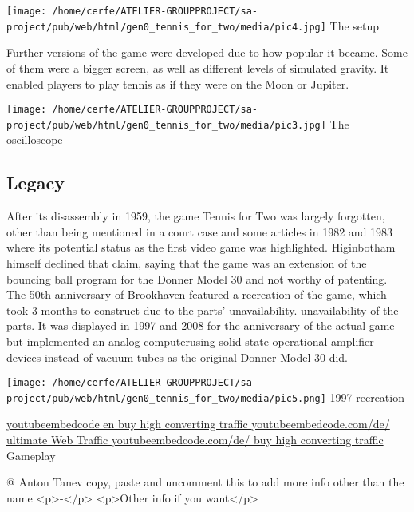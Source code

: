 \documentclass[a4paper,10pt]{book}
\begin{document}
 
 
 \texttt{[image: /home/cerfe/ATELIER-GROUPPROJECT/sa-project/pub/web/html/gen0\_tennis\_for\_two/media/pic4.jpg]}
 The setup 
 
 
 
        Further versions of the game were developed due to how popular it became. Some of them were a bigger screen,
        as well as different levels of simulated gravity. It enabled players to play tennis as if they were on the
        Moon or Jupiter.
         
 
 
 \texttt{[image: /home/cerfe/ATELIER-GROUPPROJECT/sa-project/pub/web/html/gen0\_tennis\_for\_two/media/pic3.jpg]}
 The oscilloscope 
 
 
 \subsection{Legacy }
 
        After its disassembly in 1959,  the game Tennis for Two was largely forgotten, other than being mentioned in a
        court case and some articles in 1982 and 1983 where its potential status as the first video game was highlighted.
        Higinbotham himself declined that claim, saying that the game was an extension of the bouncing ball program for
        the Donner Model 30 and not worthy of patenting. The 50th anniversary of Brookhaven featured a recreation of the
        game, which took 3 months to construct due to the parts' unavailability. unavailability of the parts.  It was displayed in 1997 and 2008
        for the anniversary of the actual game but implemented an analog computerusing solid-state operational amplifier
         devices instead of vacuum tubes as the original Donner Model 30 did.
         
 
 
 \texttt{[image: /home/cerfe/ATELIER-GROUPPROJECT/sa-project/pub/web/html/gen0\_tennis\_for\_two/media/pic5.png]}
 1997 recreation 
 
 \href{https://youtubeembedcode.com/en}{youtubeembedcode en }\href{http://www.chkrootkit.org/}{buy high converting traffic }\href{https://youtubeembedcode.com/de/}{youtubeembedcode.com/de/ }\href{https://www.jubler.org/}{ultimate Web Traffic }\href{https://youtubeembedcode.com/de/}{youtubeembedcode.com/de/ }\href{http://www.chkrootkit.org/}{buy high converting traffic }
 Gameplay 
 
 
 @ Anton Tanev 
  copy, paste and uncomment this to add more info other than the name
            <p>-</p>
            <p>Other info if you want</p>
           
\end{document}
